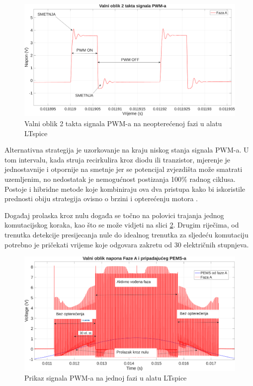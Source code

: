 \documentclass[diplomskirad]{fer}
\begin{document}
\begin{figure}[h!]
	\centering
	\includegraphics[width=\textwidth]{csv/pwm_sum_ltspice.pdf}
	\caption{Valni oblik 2 takta signala PWM-a na neopterećenoj fazi u alatu LTspice}
	\label{fig:pwm_sum}
\end{figure}

Alternativna strategija je uzorkovanje na kraju niskog stanja signala PWM-a. U
tom intervalu, kada struja recirkulira kroz diodu ili tranzistor, mjerenje je
jednostavnije i otpornije na smetnje jer se potencijal zvjezdišta može smatrati
uzemljenim, no nedostatak je nemogućnost postizanja 100\% radnog
ciklusa\label{text:pwm_off}. Postoje i hibridne metode koje kombiniraju ova dva
pristupa kako bi iskoristile prednosti obiju strategija ovisno o brzini i
opterećenju motora \cite{ST_AN1946}.

Događaj prolaska kroz nulu događa se točno na polovici trajanja jednog
komutacijskog koraka, kao što se može vidjeti na slici \ref{fig:pwm_drive}.
Drugim riječima, od trenutka detekcije presijecanja nule do idealnog trenutka
za sljedeću komutaciju potrebno je pričekati vrijeme koje odgovara zakretu od
30 električnih stupnjeva.

\begin{figure}[h!]
	\centering
	\includegraphics[width=\textwidth]{csv/faza_ltspice.pdf}
	\caption{Prikaz signala PWM-a na jednoj fazi u alatu LTspice}
	\label{fig:pwm_drive}
\end{figure}
\end{document}
